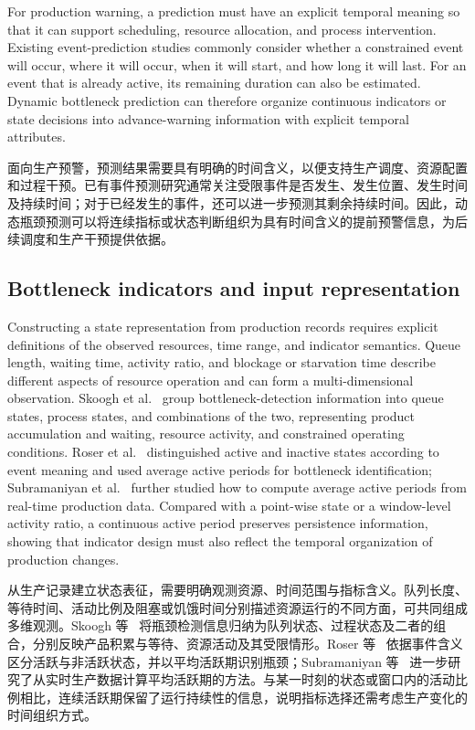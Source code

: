 \documentclass[a4paper,fleqn]{cas-dc}
\newcommand{\zhpara}[1]{%
  \par\begingroup\small\color{black!72}\noindent #1\par\endgroup}
\begin{document}
For production warning, a prediction must have an explicit temporal meaning so that it can support scheduling, resource allocation, and process intervention. Existing event-prediction studies commonly consider whether a constrained event will occur, where it will occur, when it will start, and how long it will last. For an event that is already active, its remaining duration can also be estimated. Dynamic bottleneck prediction can therefore organize continuous indicators or state decisions into advance-warning information with explicit temporal attributes.

\zhpara{面向生产预警，预测结果需要具有明确的时间含义，以便支持生产调度、资源配置和过程干预。已有事件预测研究通常关注受限事件是否发生、发生位置、发生时间及持续时间；对于已经发生的事件，还可以进一步预测其剩余持续时间。因此，动态瓶颈预测可以将连续指标或状态判断组织为具有时间含义的提前预警信息，为后续调度和生产干预提供依据。}

\subsection{Bottleneck indicators and input representation}

Constructing a state representation from production records requires explicit definitions of the observed resources, time range, and indicator semantics. Queue length, waiting time, activity ratio, and blockage or starvation time describe different aspects of resource operation and can form a multi-dimensional observation. Skoogh et al.~\cite{subramaniyan2023throughput} group bottleneck-detection information into queue states, process states, and combinations of the two, representing product accumulation and waiting, resource activity, and constrained operating conditions. Roser et al.~\cite{roser2001practical} distinguished active and inactive states according to event meaning and used average active periods for bottleneck identification; Subramaniyan et al.~\cite{subramaniyan2016realtime} further studied how to compute average active periods from real-time production data. Compared with a point-wise state or a window-level activity ratio, a continuous active period preserves persistence information, showing that indicator design must also reflect the temporal organization of production changes.

\zhpara{从生产记录建立状态表征，需要明确观测资源、时间范围与指标含义。队列长度、等待时间、活动比例及阻塞或饥饿时间分别描述资源运行的不同方面，可共同组成多维观测。Skoogh 等~\cite{subramaniyan2023throughput} 将瓶颈检测信息归纳为队列状态、过程状态及二者的组合，分别反映产品积累与等待、资源活动及其受限情形。Roser 等~\cite{roser2001practical} 依据事件含义区分活跃与非活跃状态，并以平均活跃期识别瓶颈；Subramaniyan 等~\cite{subramaniyan2016realtime} 进一步研究了从实时生产数据计算平均活跃期的方法。与某一时刻的状态或窗口内的活动比例相比，连续活跃期保留了运行持续性的信息，说明指标选择还需考虑生产变化的时间组织方式。}
\end{document}
